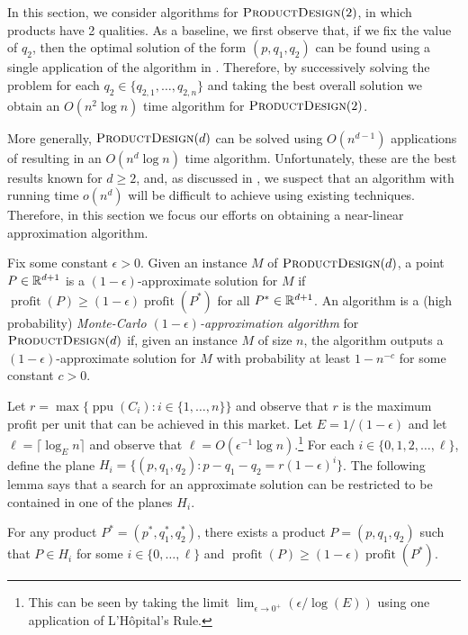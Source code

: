 \documentclass{llncs}
\newcommand{\ppu}{\operatorname{ppu}}
\newcommand{\val}{\operatorname{profit}}
\newcommand{\eps}{\epsilon}
\begin{document}
In this section, we consider algorithms for $\textsc{ProductDesign}(2)$, in
which products have 2 qualities.  As a baseline, we first observe that, if
we fix the value of $q_2$, then the optimal solution of the form $(p, q_1,
q_2)$ can be found using a single application of the algorithm in
.  Therefore, by successively solving the problem for each $q_2
\in\{q_{2,1},\ldots,q_{2,n}\}$ and taking the best overall solution we
obtain an $O(n^2\log n)$ time algorithm for $\textsc{ProductDesign}(2)$.

More generally, $\textsc{ProductDesign}(d)$ can be solved using
$O(n^{d-1})$ applications of  resulting in an $O(n^d\log n)$
time algorithm.  Unfortunately, these are the best results known for $d \ge
2$, and, as discussed in , we suspect that an algorithm
with running time $o(n^d)$ will be difficult to achieve using existing
techniques.  Therefore, in this section we focus our efforts on obtaining a
near-linear approximation algorithm.

Fix some constant $\epsilon > 0$.  Given an instance $M$ of
$\textsc{ProductDesign}(d)$, a point $P\in\mathbb{R}^{d+1}$ is a
$(1-\eps)$-approximate solution for $M$ if $\val(P) \ge (1-\eps)\val(P^*)$
for all $P^*\in\mathbb{R}^{d+1}$.  An algorithm is a (high probability)
\emph{Monte-Carlo $(1-\eps)$-approximation algorithm} for
$\textsc{ProductDesign}(d)$ if, given an instance $M$ of size $n$, the
algorithm outputs a $(1-\eps)$-approximate solution for $M$ with
probability at least $1-n^{-c}$ for some constant $c>0$.

Let $r=\max\{\ppu(C_i) : i\in\{1,\ldots, n\}\}$ and observe that $r$
is the maximum profit per unit that can be achieved in this market.
Let $E=1/(1-\eps)$ and let $\ell = \lceil\log_E n\rceil$ and observe
that $\ell = O(\eps^{-1}\log n)$.\footnote{This can be seen by taking the
limit $\lim_{\eps\rightarrow 0^+} (\eps/\log(E))$ using one application
of L'H\^opital's Rule.} For each $i\in\{0,1,2,\ldots,\ell\}$, define the
plane $H_i = \{ (p,q_1,q_2) : p-q_1-q_2 = r(1-\eps)^i \}$.  The following
lemma says that a search for an approximate solution can be restricted
to be contained in one of the planes $H_i$.

\begin{lem}
  For any product $P^*=(p^*,q_1^*,q_2^*)$, there exists a product
  $P=(p,q_1,q_2)$ such that $P\in H_i$ for some $i\in\{0,\ldots,\ell\}$
  and $\val(P) \ge (1-\eps)\val(P^*)$.
\end{lem}
\end{document}
